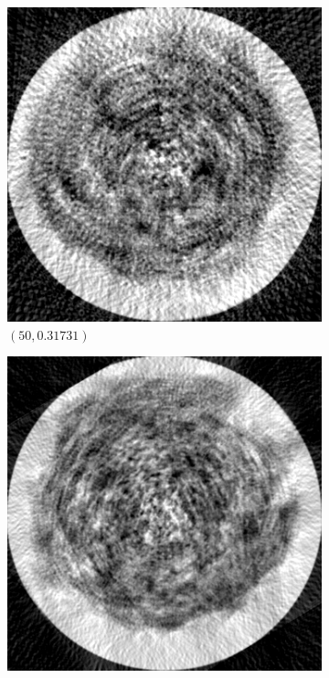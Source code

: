\documentclass[a4paper, landscape]{article}
\begin{document}
\begin{figure}[H]
	\centering
	\begin{subfigure}{0.13\linewidth}
		\centering
		\includegraphics[width=\linewidth]{results/cryoem, N = 50.png}
		\caption{$(50, 0.31731)$}
	\end{subfigure}
	\begin{subfigure}{0.13\linewidth}
		\centering
		\includegraphics[width=\linewidth]{results/cryoem, N = 100.png}

\end{subfigure}
\end{figure}
\end{document}
